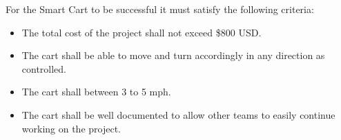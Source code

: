 For the Smart Cart to be successful it must satisfy the following criteria:
\begin{itemize}
	\item The total cost of the project shall not exceed \$800 USD. 
	\item The cart shall be able to move and turn accordingly in any direction as controlled.
	\item The cart shall between 3 to 5 mph. 
	\item The cart shall be well documented to allow other teams to easily continue working on the project.
\end{itemize}